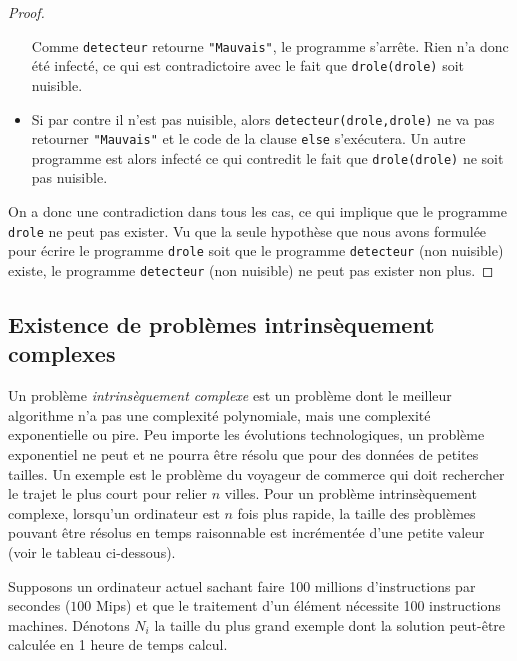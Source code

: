 \begin{proof}
\begin{itemize}
		      Comme \lstinline|detecteur| retourne \lstinline|"Mauvais"|,
		      le programme s'arrête.
		      Rien n'a donc été infecté, ce qui est contradictoire avec le fait que \lstinline|drole(drole)| soit nuisible.
		\item Si par contre il n'est pas nuisible, alors \lstinline|detecteur(drole,drole)|
		      ne va pas retourner \lstinline|"Mauvais"| et le code de la clause \lstinline|else| s'exécutera.
		      Un autre programme est alors infecté ce qui contredit le fait que \lstinline|drole(drole)| ne soit pas nuisible.
	\end{itemize}

	On a donc une contradiction dans tous les cas, ce qui implique que le programme \lstinline|drole| ne peut pas
	exister. Vu que la seule hypothèse que nous avons formulée pour écrire le programme \lstinline|drole| soit que le programme \lstinline|detecteur| (non nuisible) existe,
	le programme \lstinline|detecteur| (non nuisible) ne peut pas exister non plus.
\end{proof}

\subsection{Existence de problèmes intrinsèquement complexes}
\label{subsec:existence_de_problemes_intrinsequement_complexes}

\begin{mydef}
	Un problème \emph{intrinsèquement complexe} est un problème dont le meilleur algorithme n'a pas une complexité polynomiale, mais une complexité exponentielle ou pire. Peu importe les évolutions technologiques, un problème exponentiel ne peut et ne pourra être résolu que pour des données de petites tailles.  Un exemple est le problème du voyageur de commerce qui doit rechercher le trajet le plus court pour relier $n$ villes. Pour un problème intrinsèquement complexe, lorsqu'un ordinateur est $n$ fois plus rapide, la taille des problèmes pouvant être résolus en temps raisonnable est incrémentée d'une petite valeur (voir le tableau ci-dessous).
\end{mydef}

Supposons un ordinateur actuel sachant faire 100 millions d'instructions par secondes ($100$ Mips) et que le traitement d'un élément nécessite 100 instructions machines. Dénotons $N_i$  la taille du \og plus grand\fg{} exemple dont la solution peut-être calculée en 1 heure de temps calcul.


